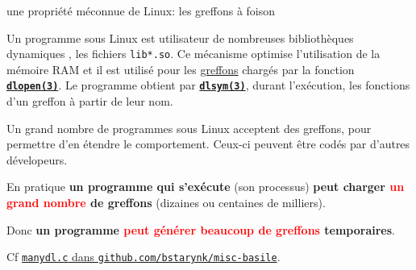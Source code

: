 \documentclass[final,a4,xcolor={svgnames,dvipsnames}]{beamer}
\begin{document}
 \begin{frame}{une propriété méconnue de Linux: les greffons à foison}


   Un programme sous Linux est {}
   utilisateur de nombreuses bibliothèques dynamiques
   {}, les fichiers
   \texttt{lib*.so}. Ce mécanisme optimise l'utilisation de la mémoire
   RAM et il est utilisé pour les
   \href{https://fr.wikipedia.org/wiki/Plugin}{greffons}
        {} chargés par la fonction
        \textbf{\texttt{\href{https://man7.org/linux/man-pages/man3/dlopen.3.html}{dlopen(3)}}}. Le
        programme obtient par
        \textbf{\texttt{\href{https://man7.org/linux/man-pages/man3/dlsym.3.html}{dlsym(3)}}},
        durant l'exécution, les fonctions d'un greffon à partir de
        leur nom.

   \medskip
     
   Un grand nombre de programmes sous Linux {} acceptent des greffons,
   pour permettre d'en étendre le comportement. Ceux-ci peuvent être
   codés par d'autres dévelopeurs.

   \bigskip

   En pratique \textbf{un programme qui s'exécute} (son processus)
   \textbf{peut charger \textcolor{red}{un grand nombre} de greffons}
   (dizaines ou centaines de milliers).

   Donc \textbf{un programme \textcolor{red}{peut générer beaucoup de greffons}
     temporaires}.

   \smallskip

   \small{Cf
   \href{https://github.com/bstarynk/misc-basile/blob/master/manydl.c}{\texttt{manydl.c}
     dans \texttt{github.com/bstarynk/misc-basile}}.}

 \end{frame}
\end{document}
